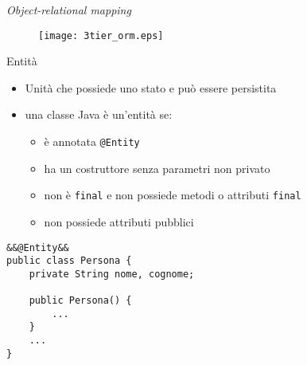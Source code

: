 \begin{frame}{\textsl{Object-relational mapping}}

\begin{figure}
	\centering
	\texttt{[image: 3tier\_orm.eps]}
\end{figure}

\end{frame}



\begin{frame}[fragile]{Entità}


\begin{itemize}
\item Unità che possiede uno stato e può essere persistita

\vspace{0.6em}

\item una classe Java è un'entità se:
	\begin{itemize}
	
	\vspace{0.3em}
	
	\item è annotata \texttt{@Entity}
	
	\vspace{0.5em}
	
	\item ha un costruttore senza parametri non privato
	
	\vspace{0.5em}
	
	\item non è \texttt{final} e non possiede metodi o attributi \texttt{final}
	
	\vspace{0.5em}
	
	\item non possiede attributi pubblici
	\end{itemize}
\end{itemize}


\begin{lstlisting}[xleftmargin=0.3\textwidth,  basicstyle={\tiny\ttfamily}]
&&@Entity&&
public class Persona {
    private String nome, cognome;
    
    public Persona() {
        ...
    }
    ...
}
\end{lstlisting}



\end{frame}



